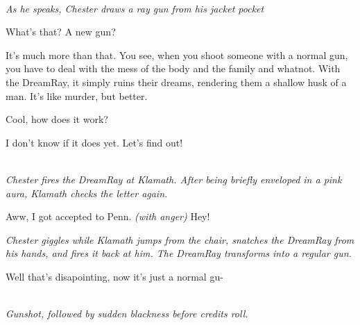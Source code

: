 \documentclass[11pt,a4paper,oneside]{memoir}  %
\begin{document}
\begin{description}[itemsep=1ex,leftmargin=1cm]
\item[] \hfill \\
\textit{As he speaks, Chester draws a ray gun from his jacket pocket}

\item[KLAMATH] What's that? A new gun?

\item[CHESTER] It's much more than that. You see, when you shoot someone with a normal gun, you have to deal with the mess of the body and the family and whatnot. With the DreamRay, it simply ruins their dreams, rendering them a shallow husk of a man. It's like murder, but better.

\item[KLAMATH] Cool, how does it work?

\item[CHESTER] I don't know if it does yet. Let's find out!

\item[] \hfill \\
\textit{Chester fires the DreamRay at Klamath. After being briefly enveloped in a pink aura, Klamath checks the letter again.}

\item[KLAMATH] Aww, I got accepted to Penn. \textit{(with anger)} Hey!

\textit{Chester giggles while Klamath jumps from the chair, snatches the DreamRay from his hands, and fires it back at him. The DreamRay transforms into a regular gun.}

\item[CHESTER] Well that's disapointing, now it's just a normal gu-

\item[] \hfill \\
\textit{Gunshot, followed by sudden blackness before credits roll.}


\end{description}
\vskip 1cm  %

\vskip 1cm
\end{document}
